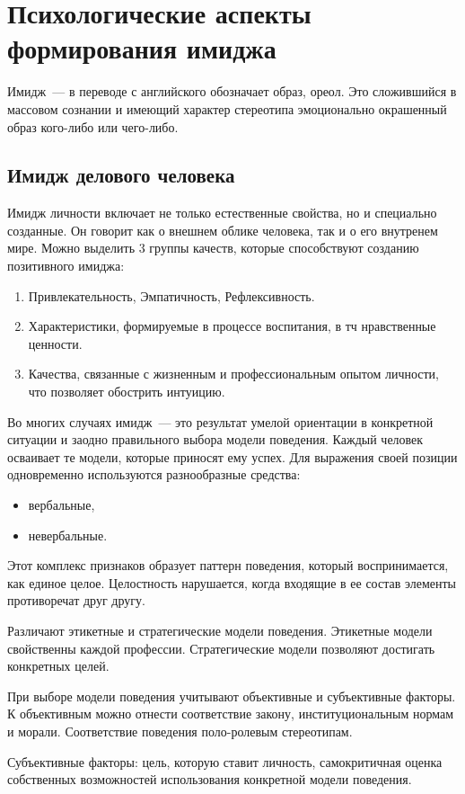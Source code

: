 \section{Психологические аспекты формирования имиджа}
Имидж~--- в переводе с английского обозначает образ, ореол. Это сложившийся в массовом сознании и имеющий характер стереотипа эмоционально окрашенный образ кого-либо или чего-либо.
\subsection{Имидж делового человека}
Имидж личности включает не только естественные свойства, но и специально созданные. Он говорит как о внешнем облике человека, так и о его внутренем мире. Можно выделить 3 группы качеств, которые способствуют созданию позитивного имиджа:
\begin{enumerate}
	\item Привлекательность, Эмпатичность, Рефлексивность.
	\item Характеристики, формируемые в процессе воспитания, в тч нравственные ценности.
	\item Качества, связанные с жизненным и профессиональным опытом личности, что позволяет обострить интуицию.
\end{enumerate}

Во многих случаях имидж~--- это результат умелой ориентации в конкретной ситуации и заодно правильного выбора модели поведения. Каждый человек осваивает те модели, которые приносят ему успех. Для выражения своей позиции одновременно используются разнообразные средства:
\begin{itemize}
	\item вербальные,
	\item невербальные.
\end{itemize}

Этот комплекс признаков образует паттерн поведения, который воспринимается, как единое целое. Целостность нарушается, когда входящие в ее состав элементы противоречат друг другу.

Различают этикетные и стратегические модели поведения. Этикетные модели свойственны каждой профессии. Стратегические модели позволяют достигать конкретных целей. 

При выборе модели поведения учитывают объективные и субъективные факторы. К объективным можно отнести соответствие закону, институциональным нормам и морали. Соответствие поведения поло-ролевым стереотипам.

Субъективные факторы: цель, которую ставит личность, самокритичная оценка собственных возможностей использования конкретной модели поведения.

